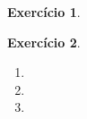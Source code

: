 \documentclass[letter,11pt]{article}
\newtheorem{exer}{Exercício}
\begin{document}
\begin{exer} \rm
\end{exer}


\begin{exer} \rm

  \begin{enumerate}
    \item %
    
    \item %
    
    \item %
  \end{enumerate}
\end{exer}
\end{document}
